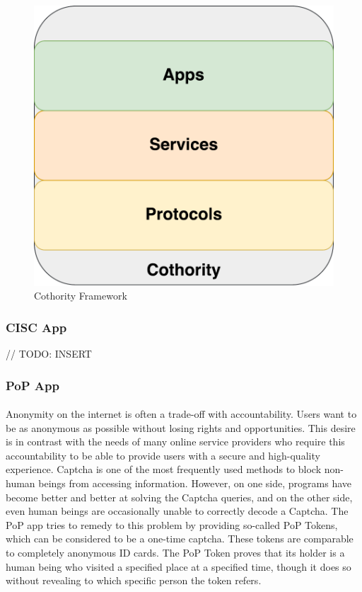 \begin{figure}[h]
\includegraphics[scale=.5]{graphic/cothority.pdf}
\centering
\caption*{Cothority Framework}
\end{figure}

\subsubsection*{CISC App}

// TODO: INSERT

\subsubsection*{PoP App\raisebox{.3\baselineskip}{\normalsize\footnotemark}}

\paragraph{}
Anonymity on the internet is often a trade-off with accountability. Users want to be as anonymous as possible without losing rights and opportunities. This desire is in contrast with the needs of many online service providers who require this accountability to be able to provide users with a secure and high-quality experience. Captcha is one of the most frequently used methods to block non-human beings from accessing information. However, on one side, programs have become better and better at solving the Captcha queries, and on the other side, even human beings are occasionally unable to correctly decode a Captcha. The PoP app tries to remedy to this problem by providing so-called PoP Tokens, which can be considered to be a one-time captcha. These tokens are comparable to completely anonymous ID cards. The PoP Token proves that its holder is a human being who visited a specified place at a specified time, though it does so without revealing to which specific person the token refers.
